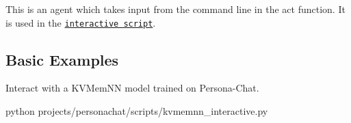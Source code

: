This is an agent which takes input from the command line in the {\ttfamily act} function. It is used in the \href{https://github.com/facebookresearch/ParlAI/blob/master/parlai/scripts/interactive.py}{\tt interactive script}.

\subsection*{Basic Examples}

Interact with a K\+V\+Mem\+NN model trained on Persona-\/\+Chat. 
\begin{DoxyCode}
python projects/personachat/scripts/kvmemnn\_interactive.py
\end{DoxyCode}
 